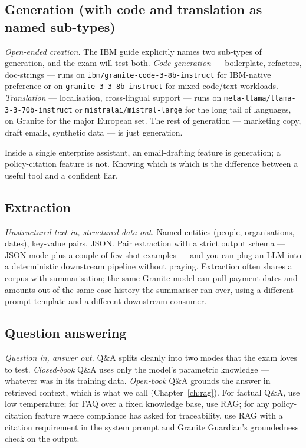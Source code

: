 \subsection{Generation (with code and translation as named sub-types)}

\emph{Open-ended creation.} The IBM guide explicitly names two sub-types of generation, and the exam will test both. \emph{Code generation} --- boilerplate, refactors, doc-strings --- runs on \texttt{ibm/granite-code-3-8b-instruct} for IBM-native preference or on \texttt{granite-3-3-8b-instruct} for mixed code/text workloads. \emph{Translation} --- localisation, cross-lingual support --- runs on \texttt{meta-llama/llama-3-3-70b-instruct} or \texttt{mistralai/mistral-large} for the long tail of languages, on Granite for the major European set. The rest of generation --- marketing copy, draft emails, synthetic data --- is just generation.

Inside a single enterprise assistant, an email-drafting feature is generation; a policy-citation feature is not. Knowing which is which is the difference between a useful tool and a confident liar.

\subsection{Extraction}

\emph{Unstructured text in, structured data out.} Named entities (people, organisations, dates), key-value pairs, JSON. Pair extraction with a strict output schema --- JSON mode plus a couple of few-shot examples --- and you can plug an LLM into a deterministic downstream pipeline without praying. Extraction often shares a corpus with summarisation; the same Granite model can pull payment dates and amounts out of the same case history the summariser ran over, using a different prompt template and a different downstream consumer.

\subsection{Question answering}

\emph{Question in, answer out.} Q\&A splits cleanly into two modes that the exam loves to test. \emph{Closed-book} Q\&A uses only the model's parametric knowledge --- whatever was in its training data. \emph{Open-book} Q\&A grounds the answer in retrieved context, which is what we call  (Chapter~\ref{ch:rag}). For factual Q\&A, use low temperature; for FAQ over a fixed knowledge base, use RAG; for any policy-citation feature where compliance has asked for traceability, use RAG with a citation requirement in the system prompt and Granite Guardian's groundedness check on the output.

